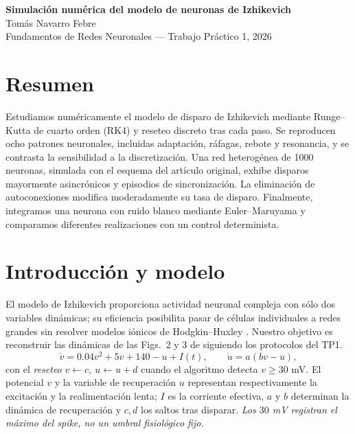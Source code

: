 \documentclass[10pt,a4paper]{article}
\begin{document}
\begin{center}
{\Large\bfseries Simulación numérica del modelo de neuronas de Izhikevich}\\[4pt]
{\normalsize Tomás Navarro Febre}\\[2pt]
{\small Fundamentos de Redes Neuronales --- Trabajo Práctico 1, 2026}
\end{center}
\vspace{-6pt}
\section*{Resumen}
Estudiamos numéricamente el modelo de disparo de Izhikevich mediante Runge--Kutta de cuarto orden (RK4) y reseteo discreto tras cada paso. Se reproducen ocho patrones neuronales, incluidas adaptación, ráfagas, rebote y resonancia, y se contrasta la sensibilidad a la discretización. Una red heterogénea de 1000 neuronas, simulada con el esquema del artículo original, exhibe disparos mayormente asincrónicos y episodios de sincronización. La eliminación de autoconexiones modifica moderadamente su tasa de disparo. Finalmente, integramos una neurona con ruido blanco mediante Euler--Maruyama y comparamos diferentes realizaciones con un control determinista.

\section{Introducción y modelo}
El modelo de Izhikevich proporciona actividad neuronal compleja con sólo dos variables dinámicas; su eficiencia posibilita pasar de células individuales a redes grandes sin resolver modelos iónicos de Hodgkin--Huxley \cite{izhikevich,hodgkin}. Nuestro objetivo es reconstruir las dinámicas de las Figs.~2 y 3 de \cite{izhikevich} siguiendo los protocolos del TP1.
\begin{equation}
\dot v=0.04v^2+5v+140-u+I(t),\qquad \dot u=a(bv-u),\label{eq:modelo}
\end{equation}
con el \emph{reseteo} $v\leftarrow c,\ u\leftarrow u+d$ cuando el algoritmo detecta $v\geq30$ mV. El potencial $v$ y la variable de recuperación $u$ representan respectivamente la excitación y la realimentación lenta; $I$ es la corriente efectiva, $a$ y $b$ determinan la dinámica de recuperación y $c,d$ los saltos tras disparar. \emph{Los $30$ mV registran el máximo del spike, no un umbral fisiológico fijo.}
\end{document}
